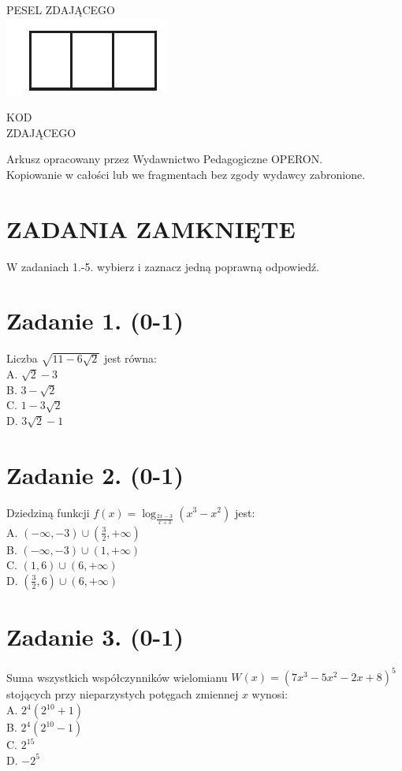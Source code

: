 \documentclass[10pt]{article}
\begin{document}
PESEL ZDAJĄCEGO\\
\includegraphics[max width=\textwidth, center]{2024_11_21_d15133c79177ee6989d3g-01(1)}

KOD\\
ZDAJĄCEGO

Arkusz opracowany przez Wydawnictwo Pedagogiczne OPERON.\\
Kopiowanie w całości lub we fragmentach bez zgody wydawcy zabronione.

\section*{ZADANIA ZAMKNIĘTE}
W zadaniach 1.-5. wybierz i zaznacz jedną poprawną odpowiedź.

\section*{Zadanie 1. (0-1)}
Liczba \(\sqrt{11-6 \sqrt{2}}\) jest równa:\\
A. \(\sqrt{2}-3\)\\
B. \(3-\sqrt{2}\)\\
C. \(1-3 \sqrt{2}\)\\
D. \(3 \sqrt{2}-1\)

\section*{Zadanie 2. (0-1)}
Dziedziną funkcji \(f(x)=\log _{\frac{2 x-3}{x+3}}\left(x^{3}-x^{2}\right)\) jest:\\
A. \((-\infty,-3) \cup\left(\frac{3}{2},+\infty\right)\)\\
B. \((-\infty,-3) \cup(1,+\infty)\)\\
C. \((1,6) \cup(6,+\infty)\)\\
D. \(\left(\frac{3}{2}, 6\right) \cup(6,+\infty)\)

\section*{Zadanie 3. (0-1)}
Suma wszystkich współczynników wielomianu \(W(x)=\left(7 x^{3}-5 x^{2}-2 x+8\right)^{5}\) stojących przy nieparzystych potęgach zmiennej \(x\) wynosi:\\
A. \(2^{4}\left(2^{10}+1\right)\)\\
B. \(2^{4}\left(2^{10}-1\right)\)\\
C. \(2^{15}\)\\
D. \(-2^{5}\)
\end{document}
